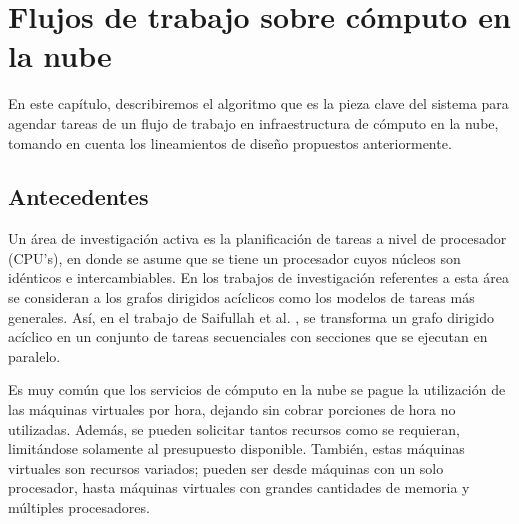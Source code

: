 \chapter[Algoritmos]{Flujos de trabajo sobre cómputo en la nube}
\label{chap:algorithm}

En este capítulo, describiremos el algoritmo que es la pieza clave del sistema para agendar tareas de un flujo de trabajo en infraestructura de cómputo en la nube, tomando en cuenta los lineamientos de diseño propuestos anteriormente.



\section{Antecedentes}

Un área de investigación activa es la planificación de tareas a nivel de procesador (CPU's), en donde se asume que se tiene un procesador cuyos núcleos son idénticos e intercambiables. En los trabajos de investigación referentes a esta área se consideran a los grafos dirigidos acíclicos como los modelos de tareas más generales. Así, en el trabajo de Saifullah et al. \cite{saifullah2013multi}, se transforma un grafo dirigido acíclico en un conjunto de tareas secuenciales con secciones que se ejecutan en paralelo.







Es muy común que los servicios de cómputo en la nube se pague la utilización de las máquinas virtuales por hora, dejando sin cobrar porciones de hora no utilizadas. Además, se pueden solicitar tantos recursos como se requieran, limitándose solamente al presupuesto disponible. Tambi\'en, estas máquinas virtuales son recursos variados; pueden ser desde máquinas con un solo procesador, hasta m\'aquinas virtuales con grandes cantidades de memoria y m\'ultiples procesadores.

